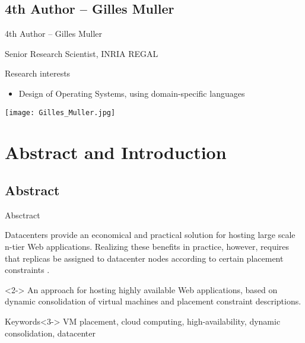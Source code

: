 \subsection{4th Author -- Gilles Muller} 
\begin{frame}{4th Author -- Gilles Muller }

Senior Research Scientist, INRIA REGAL 

\begin{block}{Research interests}
\begin{itemize}
\item Design of Operating Systems, using domain-specific languages
\end{itemize}
\end{block}

\texttt{[image: Gilles\_Muller.jpg]} 


\end{frame}


\section{Abstract and Introduction} 

\subsection{Abstract} 

\begin{frame}{Absctract}

Datacenters provide an economical and practical solution for hosting
large scale \alert{n-tier Web applications}. Realizing these benefits in practice,
however, requires that replicas be assigned to datacenter nodes according to
certain \alert {placement constraints }.



\begin{block}{\Plasma}<2->
An approach for hosting \alert{highly available} Web
applications, based on \alert{dynamic consolidation} of virtual machines and 
\alert{placement constraint} descriptions.
\end{block}

\begin{block}{Keywords}<3->
VM placement, cloud computing, high-availability, dynamic consolidation, datacenter
\end{block}


\end{frame}


